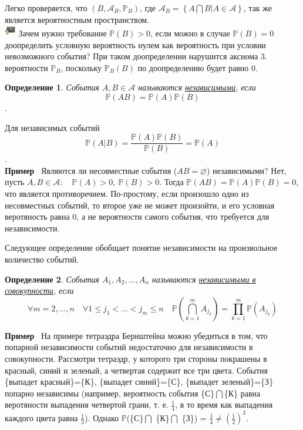 \documentclass[12pt]{article}
\newtheorem{Def}{Определение}
\newenvironment{Ex}{{\bf Пример}\ }{}
\newenvironment{Wtf}{\includegraphics[height=5mm]{ping}}{}
\numberwithin{Th}{section}
\numberwithin{Def}{section}
\numberwithin{Lem}{section}
\numberwithin{St}{section}
\numberwithin{equation}{section}
\newcommand\Set[2]{\left\{ #1 | #2 \right\}}
\newcommand\Pro{\mathbb{P}}
\newcommand\Ev{\mathscr{A}}
\begin{document}
Легко проверяется, что $(B, \Ev_B, \Pro_B)$, где $\Ev_B = \Set{A \bigcap B}{A \in \Ev}$, так же является вероятностным пространством. \\
\begin{Wtf}
Зачем нужно требование $\Pro(B) > 0$, если можно в случае $\Pro(B) = 0$ доопределить условную вероятность нулем как вероятность при условии невозможного события?
При таком доопределении нарушится аксиома 3. вероятности $\Pro_B$, поскольку $\Pro_B(B)$ по доопределению будет равно $0$.
\end{Wtf}

\begin{Def}
События $A, B \in \Ev$ называются \underline{независимыми}, если $$\Pro(AB) = \Pro(A) \Pro(B)$$.
\end{Def}

Для независимых событий $$\Pro(A|B) = \frac{\Pro(A)\Pro(B)}{\Pro(B)} = \Pro(A)$$.\\
\begin{Ex}
Являются ли несовместные события ($AB = \varnothing$) независимыми? Нет, пусть  $A, B \in \Ev \colon \quad \Pro(A) > 0, \ \Pro(B) > 0$. Тогда $\Pro(AB) = \Pro(A)\Pro(B) = 0$, 
что является противоречием. По-простому, если произошло одно из несовместных событий, то второе уже не может произойти, и его условная веротяность равна 0, а не
вероятности самого события, что требуется для независимости.
\end{Ex}

Следующее определение обобщает понятие независимости на произвольное количество событий.
\begin{Def}
События $A_1, A_2, \dots, A_n$ называются \underline{независимыми в совокупности}, если 
$$\forall m = 2, \dots, n \quad \forall 1 \le j_1 < \ldots < j_m \le n \quad 
\Pro(\bigcap_{k=1}^{m}A_{j_k})=\prod_{k=1}^{m} \Pro(A_{j_k})$$
\end{Def}
\begin{Ex}
На примере тетраэдра Бернштейна можно убедиться в том, что попарной независимости событий недостаточно для независимости в совокупности. Рассмотри тетраэдр, у 
которого три стороны покрашены в красный, синий и зеленый, а четвертая содержит все три цвета. События \{выпадет красный\}=\{К\}, \{выпадет синий\}=\{С\}, \{выпадет зеленый\}=\{З\}
попарно независимы (например, вероятность события \{С\}$\bigcap$\{К\} равна веротяности выпадения четвертой грани, т. е. $\frac{1}{4}$, в то время как выпадения 
каждого цвета равна $\frac12$). Однако $\Pro$(\{С\}$\bigcap$ \{К\}$\bigcap$ \{З\}) = $\frac14 \not= (\frac12)^3$.
\end{Ex}
\newpage
\end{document}
